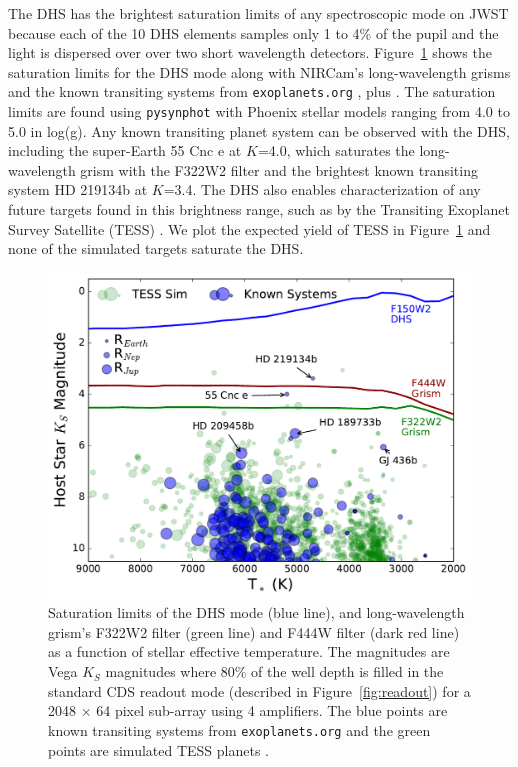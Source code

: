 \documentclass[iop]{emulateapj}
\begin{document}
The DHS has the brightest saturation limits of any spectroscopic mode on JWST because each of the 10 DHS elements samples only 1 to 4\% of the pupil and the light is dispersed over over two short wavelength detectors.
Figure~\ref{fig:saturationLim} shows the saturation limits for the DHS mode along with NIRCam's long-wavelength grisms and the known transiting systems from \texttt{exoplanets.org} \citep{han2014exopDorg}, plus \citet{motalebi2015hd219134b}.
The saturation limits are found using \texttt{pysynphot} \citep{lim2015pysynphot} with Phoenix stellar models \citep{allard2012phoenix} ranging from 4.0 to 5.0 in log(g).
Any known transiting planet system can be observed with the DHS, including the super-Earth  55 Cnc e \citep{mcarthur2004disc55cnce} at $K$=4.0, which saturates the long-wavelength grism with the F322W2 filter and the brightest known transiting system HD 219134b \citep{motalebi2015hd219134b} at $K$=3.4.
The DHS also enables characterization of any future targets found in this brightness range, such as by the Transiting Exoplanet Survey Satellite (TESS) \citep{ricker2014tess}.
We plot the expected yield of TESS \citep{sullivan2015tess} in Figure~\ref{fig:saturationLim} and none of the simulated targets saturate the DHS.

\begin{figure}[!h]
\includegraphics[width=1.0\columnwidth]{brightness_scape.pdf}
\caption{Saturation limits of the DHS mode (blue line), and long-wavelength grism's F322W2 filter (green line) and F444W filter (dark red line) as a function of stellar effective temperature.
The magnitudes are Vega $K_S$ magnitudes where 80\% of the well depth is filled in the standard CDS readout mode (described in Figure~\ref{fig:readout}) for a 2048 $\times$ 64 pixel sub-array using 4 amplifiers.
The blue points are known transiting systems from \texttt{exoplanets.org} and the green points are simulated TESS planets \citep{sullivan2015tess}.}\label{fig:saturationLim}
\end{figure}
\end{document}
